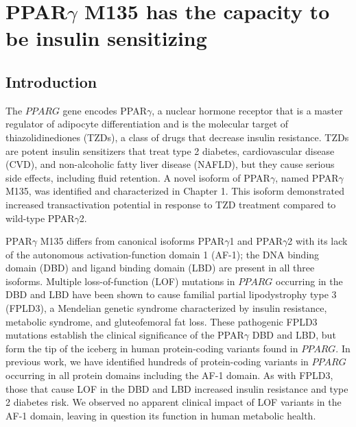 \chapter{PPAR\texorpdfstring{$\gamma$}{gamma} M135 has the capacity to be insulin sensitizing
}\label{chap:chapter 2}

\section{Introduction}

The \(PPARG\) gene encodes PPAR$\gamma$, a nuclear hormone receptor that is a master regulator of adipocyte differentiation and is the molecular target of thiazolidinediones (TZDs), a class of drugs that decrease insulin resistance\cite{Tontonoz2008-pe,Yki-Jarvinen2004-ba}. TZDs are potent insulin sensitizers that treat type 2 diabetes, cardiovascular disease (CVD), and non-alcoholic fatty liver disease (NAFLD)\cite{Kernan2016-fd,Inzucchi2016-ni,Musso2017-xi}, but they cause serious side effects, including fluid retention\cite{Yki-Jarvinen2004-ba}. A novel isoform of PPAR$\gamma$, named PPAR$\gamma$ M135, was identified and characterized in Chapter 1. This isoform demonstrated increased transactivation potential in response to TZD treatment compared to wild-type PPAR$\gamma$2.

PPAR$\gamma$ M135 differs from canonical isoforms PPAR$\gamma$1 and PPAR$\gamma$2 with its lack of the autonomous activation-function domain 1 (AF-1); the DNA binding domain (DBD) and ligand binding domain (LBD) are present in all three isoforms. Multiple loss-of-function (LOF) mutations in \(PPARG\) occurring in the DBD and LBD have been shown to cause familial partial lipodystrophy type 3 (FPLD3), a Mendelian genetic syndrome characterized by insulin resistance, metabolic syndrome, and gluteofemoral fat loss\cite{Savage2003-wm,Agostini2006-hc,Broekema2019-nz}. These pathogenic FPLD3 mutations establish the clinical significance of the PPAR$\gamma$ DBD and LBD, but form the tip of the iceberg in human protein-coding variants found in \(PPARG\)\cite{Majithia2014-op}. In previous work, we have identified hundreds of protein-coding variants in \(PPARG\) occurring in all protein domains including the AF-1 domain\cite{Majithia2016-bm}. As with FPLD3, those that cause LOF in the DBD and LBD increased insulin resistance and type 2 diabetes risk. We observed no apparent clinical impact of LOF variants in the AF-1 domain, leaving in question its function in human metabolic health.

